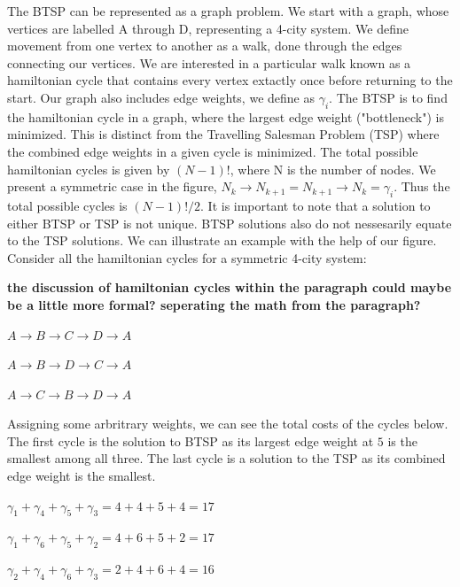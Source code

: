 \documentclass[twocolumn,showpacs,preprintnumbers,amsmath,amssymb]{revtex4}
\begin{document}
		
		
		
		The BTSP can be represented as a graph problem.  We start with a graph, whose vertices are labelled A through D, representing a 4-city system. We define movement from one vertex to another as a walk, done through the edges connecting our vertices. We are interested in a particular walk known as a hamiltonian cycle that contains every vertex extactly once before returning to the start. Our graph also includes edge weights, we define as $ \gamma_i $.
		The BTSP is to find the hamiltonian cycle in a graph, where the largest edge weight ("bottleneck") is minimized. This is distinct from the Travelling Salesman Problem (TSP) where the combined edge weights in a given cycle is minimized. The total possible hamiltonian cycles is given by $(N-1)!$, where N is the number of nodes. We present a symmetric case in the figure,  $N_k \rightarrow N_{k+1} = N_{k+1} \rightarrow N_{k} = \gamma_i$. Thus the total possible cycles is  $(N-1)!/2$.  It is important to note that a solution to either BTSP or TSP is not unique. BTSP solutions also do not nessesarily equate to the TSP solutions. We can illustrate an example with the help of our figure. Consider all the hamiltonian cycles for a symmetric 4-city system:
		
		\textbf{the discussion of hamiltonian cycles within the paragraph could maybe be a little more formal? seperating the math from the paragraph?} 
		
		\begin{center}
		$ A \rightarrow B \rightarrow C \rightarrow D \rightarrow A $
		
		$ A \rightarrow B \rightarrow D \rightarrow C \rightarrow A $ 
		
		$ A \rightarrow C \rightarrow B \rightarrow D \rightarrow A $
	    \end{center}
		
		Assigning some arbritrary weights, we can see the total costs of the cycles below. The first cycle is the solution to BTSP as its largest edge weight at $5$ is the smallest among all three. The last cycle is a solution to the TSP as its combined edge weight is the smallest.
		\begin{center}
		$\gamma_1 + \gamma_4 + \gamma_5 + \gamma_3 = 4 + 4 + 5 + 4 = 17$
		
		$ \gamma_1 + \gamma_6 + \gamma_5 + \gamma_2 = 4 + 6 + 5 + 2 = 17$
		
		$  \gamma_2 + \gamma_4 + \gamma_6 + \gamma_3 = 2 + 4 + 6 + 4 = 16$
		\end{center}
		
\end{document}
